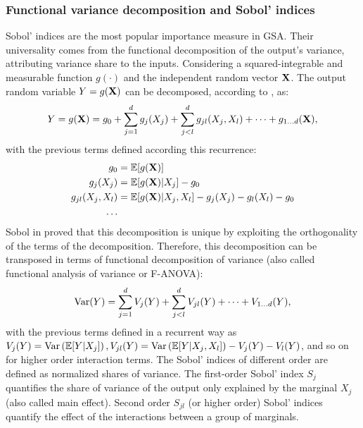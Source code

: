\subsubsection{Functional variance decomposition and Sobol' indices}
Sobol' indices are the most popular importance measure in GSA. 
Their universality comes from the functional decomposition of the output's variance, attributing variance share to the inputs. 
Considering a squared-integrable and measurable function $g(\cdot)$ and the independent random vector ${\bf X}$. 
The output random variable $Y = g({\bf X})$ can be decomposed, according to \citet{hoeffiding_1948}, as: 
\begin{equation}
    Y = g({\bf X}) = g_0 + \sum_{j=1}^{d} g_j(X_j) + \sum_{j<l}^{d} g_{jl}(X_j, X_l) + \dots + g_{1 \dots d}({\bf X}),
    \label{eq:hoeffding}
\end{equation}
with the previous terms defined according this recurrence:  
\begin{align}
    g_0 &= \mathbb{E}[g({\bf X})]\\
    g_j(X_j) &= \mathbb{E}[g({\bf X}) | X_j] - g_0\\
    g_{jl}(X_j, X_l) &= \mathbb{E}[g({\bf X}) | X_j, X_l] - g_j(X_j) - g_l(X_l) - g_0\\
    \dots
\end{align}
Sobol in \citet{sobol_1993} proved that this decomposition is unique by exploiting the orthogonality of the terms of the decomposition.
Therefore, this decomposition can be transposed in terms of functional decomposition of variance (also called functional analysis of variance or F-ANOVA):
\begin{equation}
    \operatorname{Var}(Y) = \sum_{j=1}^{d} V_j(Y)  + \sum_{j<l}^{d} V_{jl}(Y) + \dots + V_{1 \dots d}(Y), 
    \label{eq:fanova}
\end{equation}
with the previous terms defined in a recurrent way as $V_j(Y) = \operatorname{Var}\left(\mathbb{E}[Y|X_j]\right), V_{jl}(Y) = \operatorname{Var}\left(\mathbb{E}[Y|X_j, X_l]\right) - V_j(Y) - V_l(Y)$, and so on for higher order interaction terms. 
The Sobol' indices of different order are defined as normalized shares of variance. 
The first-order Sobol' index $S_j$ quantifies the share of variance of the output only explained by the marginal $X_j$ (also called main effect). 
Second order $S_{jl}$ (or higher order) Sobol' indices quantify the effect of the interactions between a group of marginals. 
